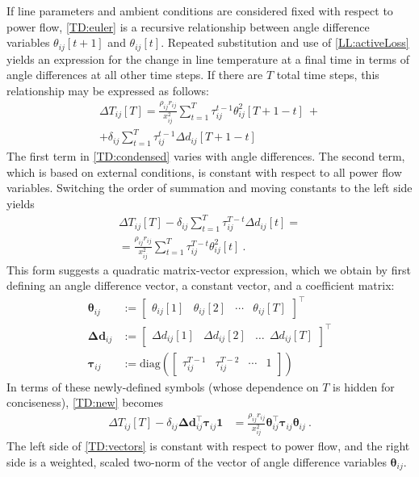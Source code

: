 \documentclass[conference]{IEEEtran}
\begin{document}
If line parameters and ambient conditions are considered fixed with respect to power flow, \eqref{TD:euler} is a recursive relationship between angle difference variables $\theta_{ij}[t+1]$ and $\theta_{ij}[t]$. Repeated substitution and use of \eqref{LL:activeLoss} yields an expression for the change in line temperature at a final time in terms of angle differences at all other time steps. If there are $T$ total time steps, this relationship may be expressed as follows:
\begin{multline}
\label{TD:condensed}
\Delta T_{ij}[T] = \frac{\rho_{ij} r_{ij}}{x_{ij}^2}\sum_{t=1}^{T}\tau_{ij}^{t-1}\theta_{ij}^2[T+1-t]~ + \\
+ \delta_{ij} \sum_{t=1}^{T}\tau_{ij}^{t-1}\Delta d_{ij} [T+1 - t]
\end{multline}
The first term in \eqref{TD:condensed} varies with angle differences. The second term, which is based on external conditions, is constant with respect to all power flow variables. Switching the order of summation and moving constants to the left side yields
\begin{multline}
\label{TD:new}
\Delta T_{ij}[T] - \delta_{ij} \sum_{t=1}^{T}\tau_{ij}^{T-t}\Delta d_{ij} [t]  = \\
 = \frac{\rho_{ij}r_{ij}}{x_{ij}^2} \sum_{t=1}^{T} \tau_{ij}^{T-t}\theta_{ij}^2[t]~.
\end{multline}
This form suggests a quadratic matrix-vector expression, which we obtain by first defining an angle difference vector, a constant vector, and a coefficient matrix:
\begin{subequations}\label{TD:matvec}
\begin{align}
\boldsymbol{\theta}_{ij} &:= \begin{bmatrix}\theta_{ij}[1] & \theta_{ij}[2] & \cdots & \theta_{ij}[T] \end{bmatrix}^\top \\
\boldsymbol{\Delta d}_{ij} &:= \begin{bmatrix}
\Delta d_{ij}[1] & \Delta d_{ij}[2] & \ldots ~~ \Delta d_{ij}[T] 
\end{bmatrix}^\top \\
\boldsymbol{\tau}_{ij} &:= \text{diag}\left(\begin{bmatrix} \tau_{ij}^{T-1} & \tau_{ij}^{T-2} & \cdots & 1 \end{bmatrix}\right)
\end{align}
\end{subequations}
In terms of these newly-defined symbols (whose dependence on $T$ is hidden for conciseness), \eqref{TD:new} becomes
\begin{align}
\label{TD:vectors}
\Delta T_{ij}[T] - \delta_{ij} \boldsymbol{\Delta d}_{ij}^\top \boldsymbol{\tau}_{ij}\mathbf{1} &= \frac{\rho_{ij}r_{ij}}{x_{ij}^2} \boldsymbol{\theta}_{ij}^\top \boldsymbol{\tau}_{ij}\boldsymbol{\theta}_{ij}~.
\end{align}
The left side of \eqref{TD:vectors} is constant with respect to power flow, and the right side is a weighted, scaled two-norm of the vector of angle difference variables $\boldsymbol{\theta}_{ij}$.
\end{document}
